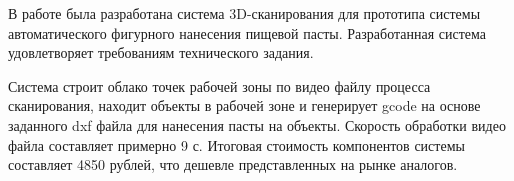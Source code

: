 \conclusion
В работе была разработана система 3D-сканирования для прототипа системы автоматического фигурного нанесения пищевой пасты. Разработанная система удовлетворяет требованиям технического задания.

Система строит облако точек рабочей зоны по видео файлу процесса сканирования, находит объекты в рабочей зоне и генерирует gcode на основе заданного dxf файла для нанесения пасты на объекты. Скорость обработки видео файла составляет примерно 9 с. Итоговая стоимость компонентов системы составляет 4850 рублей, что дешевле представленных на рынке аналогов.

